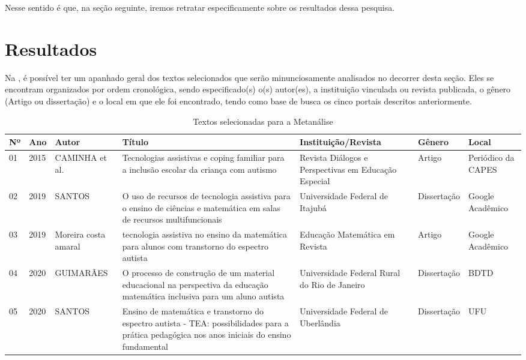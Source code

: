 \documentclass[portuguese]{textolivre}
\begin{document}
Nesse sentido é que, na seção seguinte, iremos retratar especificamente
sobre os resultados dessa pesquisa.



\section{Resultados}
Na , é possível ter um apanhado geral dos textos selecionados
que serão minunciosamente analisados no decorrer desta seção. Eles se
encontram organizados por ordem cronológica, sendo especificado(s) o(s)
autor(es), a instituição vinculada ou revista publicada, o gênero
(Artigo ou dissertação) e o local em que ele foi encontrado, tendo como
base de busca os cinco portais descritos anteriormente.

{
\setlength\LTleft{-0.9in}
\setlength\LTright{-0.9in}
\begin{footnotesize}
\begin{longtable}{ll
    >{\raggedright\arraybackslash}p{}
    >{\raggedright\arraybackslash}p{}
    >{\raggedright\arraybackslash}p{}
    l
    >{\raggedright\arraybackslash}p{}
    }
\caption{Textos selecionadas para a Metanálise}
\label{tbl02}
\\
\toprule
Nº & Ano & Autor & Título& Instituição/Revista & Gênero & Local \\
\midrule
01 & 2015 & CAMINHA et al. & Tecnologias assistivas e coping familiar para a inclusão escolar da criança com autismo & Revista Diálogos e Perspectivas em Educação Especial & Artigo & Periódico da CAPES \\

02 & 2019 & SANTOS & O uso de recursos de tecnologia assistiva para o ensino de ciências e matemática em salas de recursos multifuncionais & Universidade Federal de Itajubá & Dissertação & Google Acadêmico \\

03 & 2019 & Moreira costa amaral & tecnologia assistiva no ensino da matemática para alunos com transtorno do espectro autista & Educação Matemática em Revista & Artigo & Google
 Acadêmico \\
04 & 2020 & GUIMARÃES & O processo de construção de um material educacional na perspectiva da educação matemática inclusiva para um aluno autista & Universidade Federal Rural do Rio de Janeiro & Dissertação & BDTD \\

05 & 2020 & SANTOS & Ensino de matemática e transtorno do espectro autista - TEA: possibilidades para a prática pedagógica nos anos iniciais do ensino fundamental & Universidade Federal de Uberlândia & Dissertação & UFU \\


\end{longtable}
\end{footnotesize}}
\end{document}
